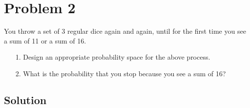 
\section{Problem 2}

You throw a set of 3 regular dice again and again, until for the first time you see a
sum of 11 or a sum of 16.
\begin{itemize}
	\item[1.] Design an appropriate probability space for the above process.
	\item[2.] What is the probability that you stop because you see a sum of 16?
\end{itemize}

\subsection{Solution}